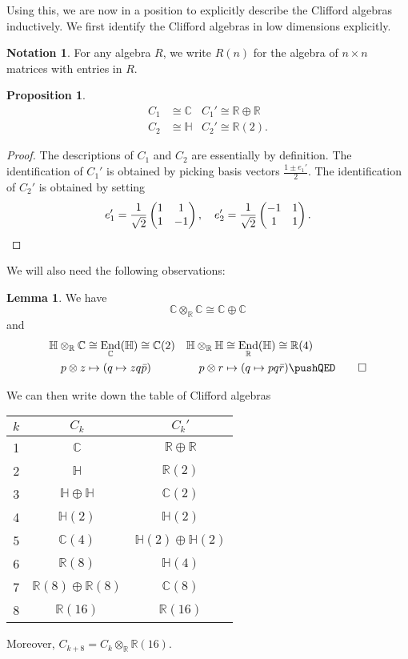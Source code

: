 \documentclass{shortart}
\theoremstyle{definition}
\newtheorem*{prop}{Proposition}
\newtheorem*{notation}{Notation}
\newtheorem*{lemma}{Lemma}
\newcommand\R{\mathbb{R}}
\newcommand\C{\mathbb{C}}
\renewcommand\H{\mathbb{H}}
\DeclareMathOperator{\End}{End}
\begin{document}
Using this, we are now in a position to explicitly describe the Clifford algebras inductively. We first identify the Clifford algebras in low dimensions explicitly.

\begin{notation}
  For any algebra $R$, we write $R(n)$ for the algebra of $n \times n$ matrices with entries in $R$.
\end{notation}

\begin{prop}
  \begin{align*}
    C_1 &\cong \C & C_1' \cong \R \oplus \R\\
    C_2 &\cong \H & C_2' \cong \R(2).
  \end{align*}
\end{prop}

\begin{proof}
  The descriptions of $C_1$ and $C_2$ are essentially by definition. The identification of $C_1'$ is obtained by picking basis vectors $\frac{1 \pm e_1'}{2}$. The identification of $C_2'$ is obtained by setting
  \[
    e_1' = \frac{1}{\sqrt{2}}
    \begin{pmatrix}
      1 & 1\\
      1 & -1
    \end{pmatrix},\quad
    e_2' = \frac{1}{\sqrt{2}}
    \begin{pmatrix}
      -1 & 1\\
      1 & 1
    \end{pmatrix}.\qedhere
  \]
\end{proof}

We will also need the following observations:
\begin{lemma}
  We have
  \[
    \C \otimes_\R \C \cong \C \oplus \C
  \]
  and
  \begin{align*}
    \H \otimes_\R \C &\cong \End_\C(\H) \cong \C(2) & \H \otimes_\R \H &\cong \End_\R(\H) \cong \R(4)\\
    p \otimes z &\mapsto (q \mapsto zq\bar{p}) & p \otimes r &\mapsto (q \mapsto p q \bar{r})\fakeqed
  \end{align*}
\end{lemma}

We can then write down the table of Clifford algebras
\begin{center}
  \begin{tabular}{ccc}
    \toprule
    $k$ & $C_k$ & $C_k'$\\
    \midrule
    1 & $\C$ & $\R \oplus \R$ \\
    2 & $\H$ & $\R(2)$ \\
    3 & $\H \oplus \H$ & $\C(2)$ \\
    4 & $\H(2)$ & $\H(2)$\\
    5 & $\C(4)$ & $\H(2) \oplus \H(2)$\\
    6 & $\R(8)$ & $\H(4)$\\
    7 & $\R(8) \oplus \R(8)$ & $\C(8)$\\
    8 & $\R(16)$ & $\R(16)$\\
    \bottomrule
  \end{tabular}
\end{center}
Moreover, $C_{k + 8} = C_k \otimes_\R \R(16)$.
\end{document}
